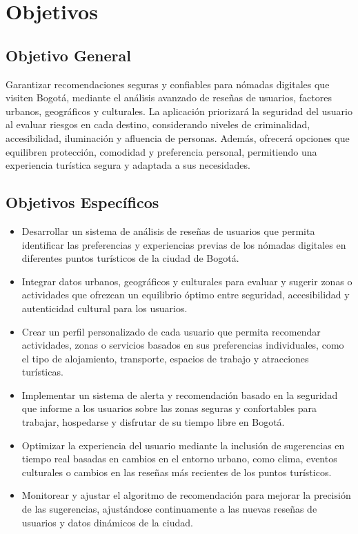 \section{Objetivos}

\subsection{Objetivo General}

Garantizar recomendaciones seguras y confiables para nómadas digitales que visiten Bogotá, mediante el análisis avanzado de reseñas de usuarios, factores urbanos, geográficos y culturales. La aplicación priorizará la seguridad del usuario al evaluar riesgos en cada destino, considerando niveles de criminalidad, accesibilidad, iluminación y afluencia de personas. Además, ofrecerá opciones que equilibren protección, comodidad y preferencia personal, permitiendo una experiencia turística segura y adaptada a sus necesidades.

\subsection{Objetivos Específicos}
\begin{itemize}
    \item Desarrollar un sistema de análisis de reseñas de usuarios que permita identificar las preferencias y experiencias previas de los nómadas digitales en diferentes puntos turísticos de la ciudad de Bogotá.
    \item Integrar datos urbanos, geográficos y culturales para evaluar y sugerir zonas o actividades que ofrezcan un equilibrio óptimo entre seguridad, accesibilidad y autenticidad cultural para los usuarios.
    \item Crear un perfil personalizado de cada usuario que permita recomendar actividades, zonas o servicios basados en sus preferencias individuales, como el tipo de alojamiento, transporte, espacios de trabajo y atracciones turísticas.
    \item Implementar un sistema de alerta y recomendación basado en la seguridad que informe a los usuarios sobre las zonas seguras y confortables para trabajar, hospedarse y disfrutar de su tiempo libre en Bogotá.
    \item Optimizar la experiencia del usuario mediante la inclusión de sugerencias en tiempo real basadas en cambios en el entorno urbano, como clima, eventos culturales o cambios en las reseñas más recientes de los puntos turísticos.
    \item Monitorear y ajustar el algoritmo de recomendación para mejorar la precisión de las sugerencias, ajustándose continuamente a las nuevas reseñas de usuarios y datos dinámicos de la ciudad.
\end{itemize}
